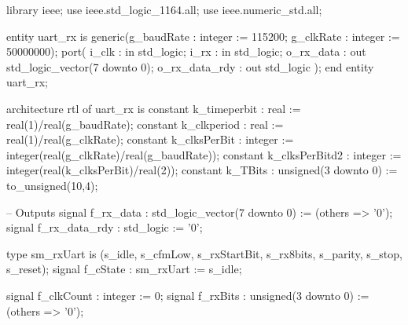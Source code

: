 \begin{VHDLlisting}[tabsize=8]
library ieee;
use ieee.std_logic_1164.all;
use ieee.numeric_std.all;

entity uart_rx is
  generic(g_baudRate : integer := 115200;
          g_clkRate  : integer := 50000000);
  port(
      i_clk           : in    std_logic;
      i_rx            : in    std_logic;
      o_rx_data       : out   std_logic_vector(7 downto 0);
      o_rx_data_rdy   : out   std_logic
      );
end entity uart_rx;

architecture rtl of uart_rx is
  constant k_timeperbit   : real := real(1)/real(g_baudRate);
  constant k_clkperiod    : real := real(1)/real(g_clkRate);
  constant k_clksPerBit   : integer := integer(real(g_clkRate)/real(g_baudRate));
  constant k_clksPerBitd2 : integer := integer(real(k_clksPerBit)/real(2));
  constant k_TBits        : unsigned(3 downto 0) := to_unsigned(10,4);

  -- Outputs 
  signal f_rx_data     : std_logic_vector(7 downto 0) := (others => '0');
  signal f_rx_data_rdy : std_logic := '0';
  
  type sm_rxUart is (s_idle, s_cfmLow, s_rxStartBit, s_rx8bits, s_parity, s_stop, s_reset);
  signal f_cState : sm_rxUart := s_idle;
  
  signal f_clkCount : integer := 0;
  signal f_rxBits   : unsigned(3 downto 0) := (others => '0');
  

\end{VHDLlisting}
